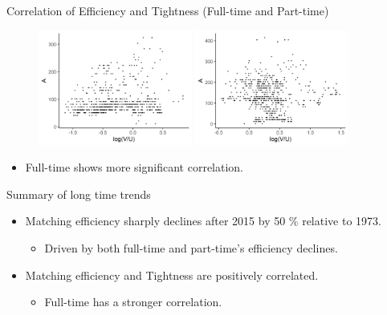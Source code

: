 \documentclass[aspectratio=169]{beamer}
\begin{document}
\begin{frame}{Correlation of Efficiency and Tightness (Full-time and Part-time)}
    
\begin{figure}[!ht]
  \begin{center}
  \includegraphics[width = 0.45\textwidth]
  {figuretable/efficiency_tightness_plot_month_full_time.png}
  \includegraphics[width = 0.45\textwidth]
  {figuretable/efficiency_tightness_plot_month_part_time.png}
  \end{center}
  \footnotesize
\end{figure} 
\begin{itemize}
    \item Full-time shows more significant correlation.
\end{itemize}
\end{frame}

\begin{frame}{Summary of long time trends}
    \begin{itemize}
        \item Matching efficiency sharply declines after 2015 by 50 \% relative to 1973.
        \begin{itemize}
            \item Driven by both full-time and part-time's efficiency declines.
        \end{itemize}
        
        \item Matching efficiency and Tightness are positively correlated.
        \begin{itemize}
            \item Full-time has a stronger correlation.
        \end{itemize}
        
    \end{itemize}
\end{frame}
\end{document}
